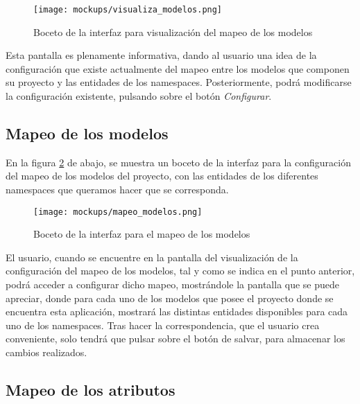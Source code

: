 \begin{figure}[H]
    \begin{center}
        \texttt{[image: mockups/visualiza\_modelos.png]}
    \end{center}
    \caption{Boceto de la interfaz para visualización del mapeo de los modelos}
    \label{fig:visualiza_modelos}
\end{figure}

Esta pantalla es plenamente informativa, dando al usuario una idea de la
configuración que existe actualmente del mapeo entre los modelos que componen su
proyecto y las entidades de los namespaces. Posteriormente, podrá modificarse la
configuración existente, pulsando sobre el botón \textit{Configurar}.

\subsection{Mapeo de los modelos}

En la figura \ref{fig:mapeo_modelos} de abajo, se muestra un boceto de la
interfaz para la configuración del mapeo de los modelos del proyecto, con las
entidades de los diferentes namespaces que queramos hacer que se corresponda.

\newpage

\begin{figure}[H]
    \begin{center}
        \texttt{[image: mockups/mapeo\_modelos.png]}
    \end{center}
    \caption{Boceto de la interfaz para el mapeo de los modelos}
    \label{fig:mapeo_modelos}
\end{figure}

El usuario, cuando se encuentre en la pantalla del visualización de la
configuración del mapeo de los modelos, tal y como se indica en el punto
anterior, podrá acceder a configurar dicho mapeo, mostrándole la pantalla
que se puede apreciar, donde para cada uno de los modelos que posee el proyecto
donde se encuentra esta aplicación, mostrará las distintas entidades disponibles
para cada uno de los namespaces. Tras hacer la correspondencia, que el usuario
crea conveniente, solo tendrá que pulsar sobre el botón de salvar, para almacenar
los cambios realizados.

\subsection{Mapeo de los atributos}

